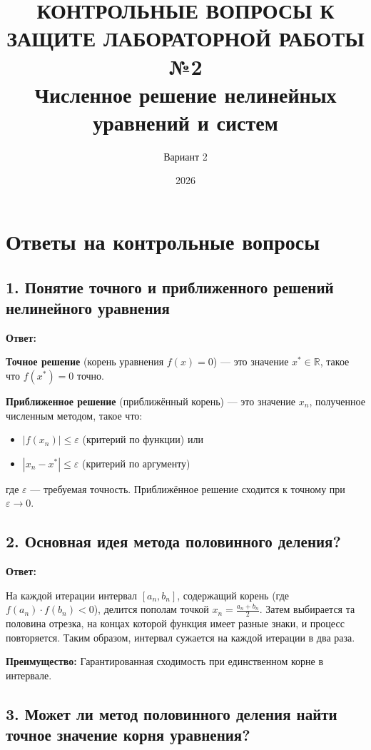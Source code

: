 \documentclass[a4paper,12pt]{article}
\title{\Large \textbf{КОНТРОЛЬНЫЕ ВОПРОСЫ К ЗАЩИТЕ ЛАБОРАТОРНОЙ РАБОТЫ №2} \\
    \normalsize Численное решение нелинейных уравнений и систем}
\author{Вариант 2}
\date{2026}
\begin{document}
\maketitle

\section*{Ответы на контрольные вопросы}

\subsection*{1. Понятие точного и приближенного решений нелинейного уравнения}

\textbf{Ответ:} 

\textbf{Точное решение} (корень уравнения $f(x) = 0$) --- это значение $x^* \in \mathbb{R}$, такое что $f(x^*) = 0$ точно.

\textbf{Приближенное решение} (приближённый корень) --- это значение $x_n$, полученное численным методом, такое что:
\begin{itemize}
    \item $|f(x_n)| \leq \varepsilon$ (критерий по функции) или
    \item $|x_n - x^*| \leq \varepsilon$ (критерий по аргументу)
\end{itemize}

где $\varepsilon$ --- требуемая точность. Приближённое решение сходится к точному при $\varepsilon \to 0$.

\subsection*{2. Основная идея метода половинного деления?}

\textbf{Ответ:} 

На каждой итерации интервал $[a_n, b_n]$, содержащий корень (где $f(a_n) \cdot f(b_n) < 0$), делится пополам точкой $x_n = \frac{a_n + b_n}{2}$. Затем выбирается та половина отрезка, на концах которой функция имеет разные знаки, и процесс повторяется. Таким образом, интервал сужается на каждой итерации в два раза.

\textbf{Преимущество:} Гарантированная сходимость при единственном корне в интервале.

\subsection*{3. Может ли метод половинного деления найти точное значение корня уравнения?}
\end{document}
